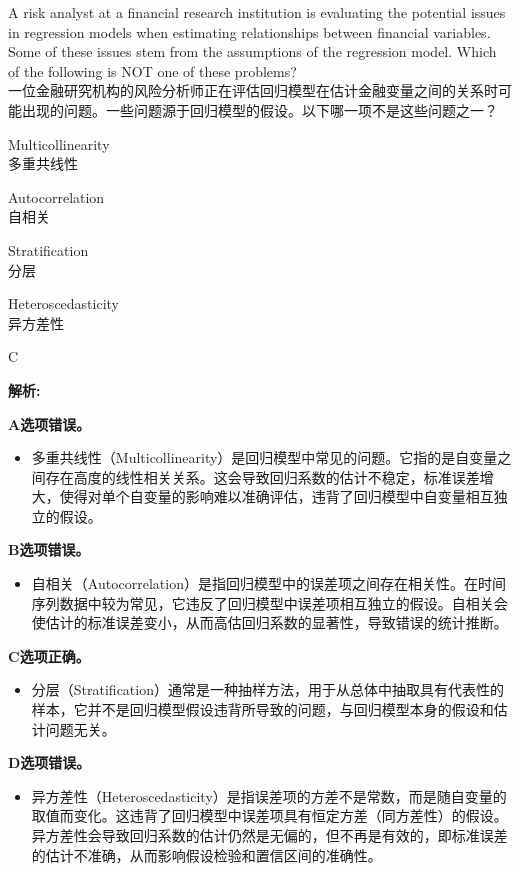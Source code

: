 \documentclass{article}
\newcounter{question} %
\newenvironment{explanation}
{\textbf{解析:}\par}
{\par}
\begin{document}
    \begin{question}
    A risk analyst at a financial research institution is evaluating the potential issues in regression models when estimating relationships between financial variables. Some of these issues stem from the assumptions of the regression model. Which of the following is NOT one of these problems?\\
    一位金融研究机构的风险分析师正在评估回归模型在估计金融变量之间的关系时可能出现的问题。一些问题源于回归模型的假设。以下哪一项不是这些问题之一？
    \end{question}
    
    \begin{choices}
        \item Multicollinearity\\
        多重共线性
        \item Autocorrelation\\
        自相关
        \item Stratification\\
        分层
        \item Heteroscedasticity\\
        异方差性
    \end{choices}
    
    \begin{correctanswer}
        C
    \end{correctanswer}
    
    \begin{explanation}
    \textbf{A选项错误。}
    \begin{itemize}
        \item 多重共线性（Multicollinearity）是回归模型中常见的问题。它指的是自变量之间存在高度的线性相关关系。这会导致回归系数的估计不稳定，标准误差增大，使得对单个自变量的影响难以准确评估，违背了回归模型中自变量相互独立的假设。
    \end{itemize}
    \textbf{B选项错误。}
    \begin{itemize}
        \item 自相关（Autocorrelation）是指回归模型中的误差项之间存在相关性。在时间序列数据中较为常见，它违反了回归模型中误差项相互独立的假设。自相关会使估计的标准误差变小，从而高估回归系数的显著性，导致错误的统计推断。
    \end{itemize}
    \textbf{C选项正确。}
    \begin{itemize}
        \item 分层（Stratification）通常是一种抽样方法，用于从总体中抽取具有代表性的样本，它并不是回归模型假设违背所导致的问题，与回归模型本身的假设和估计问题无关。
    \end{itemize}
    \textbf{D选项错误。}
    \begin{itemize}
        \item 异方差性（Heteroscedasticity）是指误差项的方差不是常数，而是随自变量的取值而变化。这违背了回归模型中误差项具有恒定方差（同方差性）的假设。异方差性会导致回归系数的估计仍然是无偏的，但不再是有效的，即标准误差的估计不准确，从而影响假设检验和置信区间的准确性。
    \end{itemize}
    \end{explanation}
    
\end{document}
